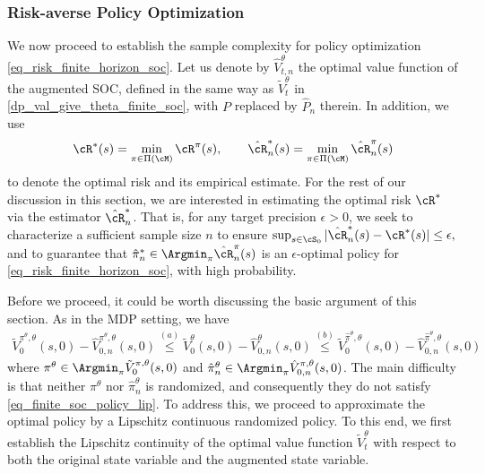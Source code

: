 \documentclass[9pt]{article}
\numberwithin{equation}{section}
\begin{document}
\subsubsection{Risk-averse Policy Optimization}






We now proceed to establish the sample complexity for policy optimization \eqref{eq_risk_finite_horizon_soc}. Let us denote by $\hat{V}_{t,n}^{\theta}$ the optimal value function of the augmented SOC, defined in the same way as $\tilde{V}_{t}^{\theta}$ in \eqref{dp_val_give_theta_finite_soc}, with $P$ replaced by $\hat{P}_n$ therein. In addition, we use
\begin{align}
    \cR^*(s)=\min_{\pi\in\Pi(\cM)}\cR^\pi(s),
\qquad
\hat{\cR}_n^*(s)=\min_{\pi\in\Pi(\cM)}\hat{\cR}_n^\pi(s) \nonumber
\end{align}
to denote the optimal risk and its empirical estimate. For the rest of our discussion in this section, we are interested in estimating the optimal risk $\cR^*$ via the estimator $\hat{\cR}_n^*$. That is, for any target precision $\epsilon>0$, we seek to characterize a sufficient sample size $n$ to ensure $\sup_{s\in\cS_0}|\hat{\cR}_n^*(s)-\cR^*(s)|\leq \epsilon,$ and to guarantee that $\hat{\pi}_n^* \in \Argmin_{\pi} \hat{\cR}_n^\pi(s)$ is an $\epsilon$-optimal policy for \eqref{eq_risk_finite_horizon_soc}, with high probability.

Before we proceed, it could be worth discussing the basic argument of this section. As in the MDP setting, we have
\begin{align}\label{ineq_policy_opt_soc_basic}
    \tilde{V}_0^{\pi^\theta, \theta}(s,0) - \hat{V}_{0,n}^{\pi^\theta, \theta}(s,0) \overset{(a)}{\leq} \tilde{V}_0^{\theta}(s,0) - \hat{V}_{0,n}^{\theta}(s,0) \overset{(b)}{\leq} \tilde{V}_0^{\hat{\pi}^\theta, \theta}(s,0) - \hat{V}_{0,n}^{\hat{\pi}^\theta, \theta}(s,0) 
\end{align}  
where $\pi^\theta \in \Argmin_{\pi} \tilde{V}_{0}^{\pi,\theta}(s,0)$ and $\hat{\pi}_n^\theta \in \Argmin_{\pi} \hat{V}_{0,n}^{\pi,\theta}(s,0)$. The main difficulty is that neither $\pi^\theta$ nor $\hat{\pi}_n^\theta$ is randomized, and consequently they do not satisfy \eqref{eq_finite_soc_policy_lip}. To address this, we proceed to approximate the optimal policy by a Lipschitz continuous randomized policy. To this end, we first establish the Lipschitz continuity of the optimal value function $\tilde{V}_{t}^{\theta}$ with respect to both the original state variable and the augmented state variable.
\end{document}
